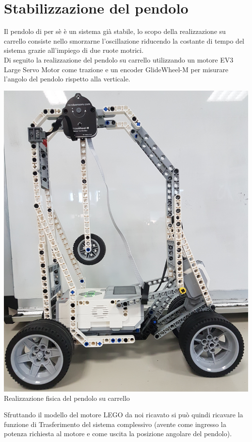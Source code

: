 \section{Stabilizzazione del pendolo}
Il pendolo di per sè è un sistema già stabile, lo scopo della realizzazione su carrello consiste nello smorzarne l'oscillazione riducendo la costante di tempo del sistema grazie all'impiego di due ruote motrici.\\
Di seguito la realizzazione del pendolo su carrello utilizzando un motore EV3 Large Servo Motor come trazione e un encoder GlideWheel-M per misurare l'angolo del pendolo rispetto alla verticale.
\begin{center}
	\includegraphics[scale=0.08]{pendoloFisico.jpg}\\
	{\footnotesize  Realizzazione fisica del pendolo su carrello}
\end{center}
Sfruttando il modello del motore LEGO da noi ricavato si può quindi ricavare la funzione di Trasferimento del sistema complessivo (avente come ingresso la potenza richiesta al motore e come uscita la posizione angolare del pendolo).\\
